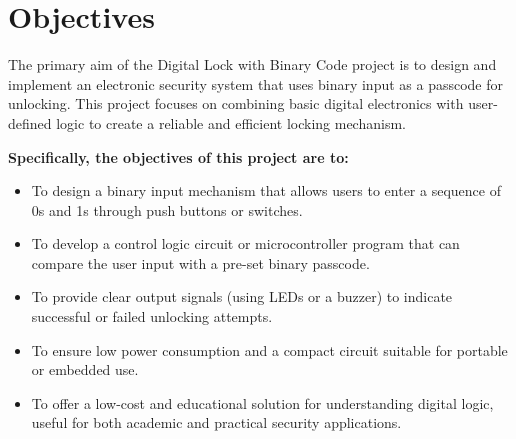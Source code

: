 \section{Objectives}
The primary aim of the Digital Lock with Binary Code project is to design and implement an electronic security system that uses binary input as a passcode for unlocking. This project focuses on combining basic digital electronics with user-defined logic to create a reliable and efficient locking mechanism.
\item \textbf{Specifically, the objectives of this project are to:}
\begin{itemize}
\item To design a binary input mechanism that allows users to enter a sequence of 0s and 1s through push buttons or switches.
\item To develop a control logic circuit or microcontroller program that can compare the user input with a pre-set binary passcode.
\item To provide clear output signals (using LEDs or a buzzer) to indicate successful or failed unlocking attempts.
\item To ensure low power consumption and a compact circuit suitable for portable or embedded use.
\item To offer a low-cost and educational solution for understanding digital logic, useful for both academic and practical security applications.\cite{1.3}
\end{itemize}

